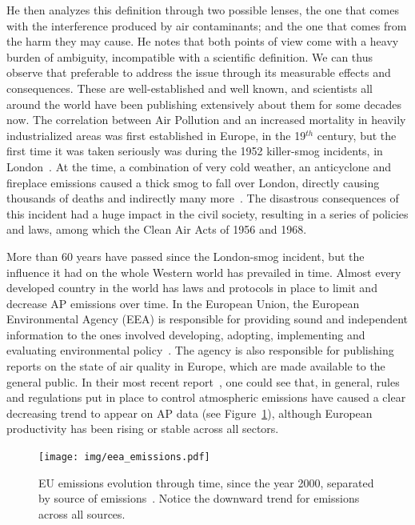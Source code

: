 He then analyzes this definition through two possible lenses, the one
that comes with the interference produced by air contaminants; and the
one that comes from the harm they may cause. He notes that both points
of view come with a heavy burden of ambiguity, incompatible with a
scientific definition. We can thus observe that preferable to address
the issue through its measurable effects and consequences. These are
well-established and well known, and scientists all around the world
have been publishing extensively about them for some decades now. The
correlation between Air Pollution and an increased mortality in heavily
industrialized areas was first established in Europe, in the 19$^{th}$
century, but the first time it was taken seriously was during the 1952
killer-smog incidents, in London~\cite{Platt2007}. At the time, a
combination of very cold weather, an anticyclone and fireplace emissions
caused a thick smog to fall over London, directly causing thousands of
deaths and indirectly many more~\cite{Bell2008,Office2019}. The
disastrous consequences of this incident had a huge impact in the civil
society, resulting in a series of policies and laws, among which the
Clean Air Acts of 1956 and 1968.

More than 60 years have passed since the London-smog incident, but the
influence it had on the whole Western world has prevailed in time.
Almost every developed country in the world has laws and protocols in
place to limit and decrease \gls{AP} emissions over time. In the
European Union, the European Environmental Agency (\gls{EEA}) is
responsible for providing sound and independent information to the ones
involved developing, adopting, implementing and evaluating environmental
policy~\cite{EEA2019}. The agency is also responsible for publishing
reports on the state of air quality in Europe, which are made available
to the general public. In their most recent report~\cite{EEA2016}, one
could see that, in general, rules and regulations put in place to
control atmospheric emissions have caused a clear decreasing trend to
appear on \gls{AP} data (see Figure~\ref{fig:eu_chart_page}), although
European productivity has been rising or stable across all sectors.

\begin{figure}[htpb]
    \centering
    \texttt{[image: img/eea\_emissions.pdf]}
    \caption{EU emissions evolution through time, since the year 2000,
    separated by source of emissions~\cite{EEA2016}. Notice the downward
    trend for emissions across all sources.}
    \label{fig:eu_chart_page}
\end{figure}

